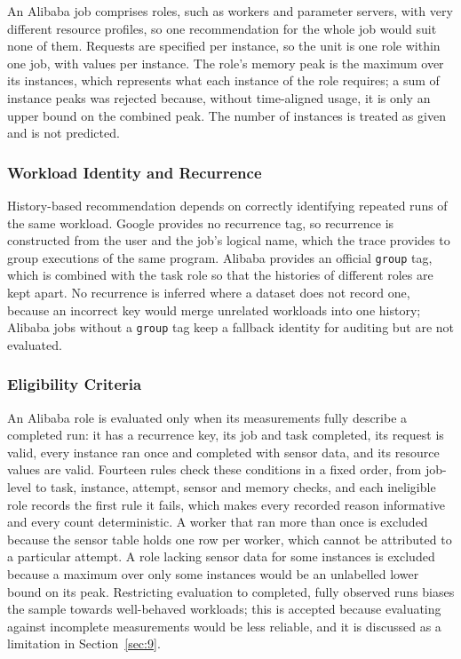 An Alibaba job comprises roles, such as workers and parameter servers, with very different resource profiles, so one recommendation for the whole job would suit none of them. Requests are specified per instance, so the unit is one role within one job, with values per instance. The role's memory peak is the maximum over its instances, which represents what each instance of the role requires; a sum of instance peaks was rejected because, without time-aligned usage, it is only an upper bound on the combined peak. The number of instances is treated as given and is not predicted.

\subsubsection{Workload Identity and Recurrence}\label{sec:4.1.5}

History-based recommendation depends on correctly identifying repeated runs of the same workload. Google provides no recurrence tag, so recurrence is constructed from the user and the job's logical name, which the trace provides to group executions of the same program. Alibaba provides an official \texttt{group} tag, which is combined with the task role so that the histories of different roles are kept apart. No recurrence is inferred where a dataset does not record one, because an incorrect key would merge unrelated workloads into one history; Alibaba jobs without a \texttt{group} tag keep a fallback identity for auditing but are not evaluated.

\subsubsection{Eligibility Criteria}\label{sec:4.1.6}

An Alibaba role is evaluated only when its measurements fully describe a completed run: it has a recurrence key, its job and task completed, its request is valid, every instance ran once and completed with sensor data, and its resource values are valid. Fourteen rules check these conditions in a fixed order, from job-level to task, instance, attempt, sensor and memory checks, and each ineligible role records the first rule it fails, which makes every recorded reason informative and every count deterministic. A worker that ran more than once is excluded because the sensor table holds one row per worker, which cannot be attributed to a particular attempt. A role lacking sensor data for some instances is excluded because a maximum over only some instances would be an unlabelled lower bound on its peak. Restricting evaluation to completed, fully observed runs biases the sample towards well-behaved workloads; this is accepted because evaluating against incomplete measurements would be less reliable, and it is discussed as a limitation in Section~\ref{sec:9}.

